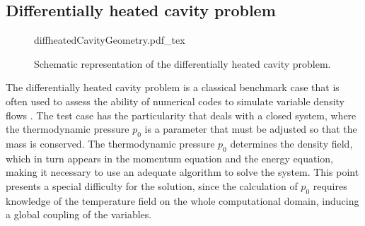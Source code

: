 \subsection{Differentially heated cavity problem}\label{ss:DHC}
\begin{figure}[bt]
	\begin{center}
		\def\svgwidth{0.53\textwidth}
		{diffheatedCavityGeometry.pdf_tex}
		\caption{Schematic representation of the differentially heated cavity problem.}
		\label{DHCGeom}
	\end{center}
\end{figure}
The differentially heated cavity problem is a classical benchmark case that is often used to assess the ability of numerical codes to simulate variable density flows \parencite{paillereComparisonLowMach2000,vierendeelsBenchmarkSolutionsNatural2003,tyliszczakProjectionMethodHighorder2014}.
The test case has the particularity that deals with a closed system, where the thermodynamic pressure $p_0$ is a parameter that must be adjusted so that the mass is conserved. The thermodynamic pressure $p_0$ determines the density field, which in turn appears in the momentum equation and the energy equation, making it necessary to use an adequate algorithm to solve the system. This point presents a special difficulty for the solution, since the calculation of $p_0$ requires knowledge of the temperature field on the whole computational domain, inducing a global coupling of the variables. 

